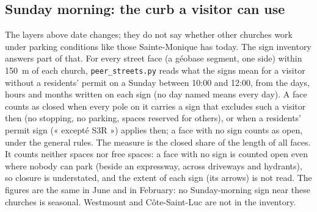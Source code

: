 \documentclass[11pt,letterpaper]{article}
\begin{document}
\subsection{Sunday morning: the curb a visitor can use}\label{sec:sunday}

The layers above date changes; they do not say whether other churches work under parking conditions like those Sainte-Monique has today. The sign inventory answers part of that. For every street face (a géobase segment, one side) within 150~m of each church, \texttt{peer\_streets.py} reads what the signs mean for a visitor without a residents' permit on a Sunday between 10:00 and 12:00, from the days, hours and months written on each sign (no day named means every day). A face counts as closed when every pole on it carries a sign that excludes such a visitor then (no stopping, no parking, spaces reserved for others), or when a residents' permit sign (« excepté S3R ») applies then; a face with no sign counts as open, under the general rules. The measure is the closed share of the length of all faces. It counts neither spaces nor free spaces: a face with no sign is counted open even where nobody can park (beside an expressway, across driveways and hydrants), so closure is understated, and the extent of each sign (its arrows) is not read. The figures are the same in June and in February: no Sunday-morning sign near these churches is seasonal. Westmount and Côte-Saint-Luc are not in the inventory.

\begin{center}\small\resizebox{\textwidth}{!}{}\end{center}
\end{document}
